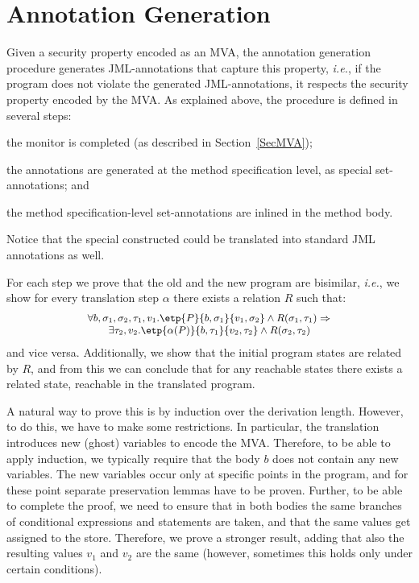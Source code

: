 \section{Annotation Generation}\label{SecAnnotGen}

Given a security property encoded as an MVA, the annotation generation
procedure generates JML-annotations that capture this property,
\emph{i.e.}, if the program does not violate the generated %
JML-annotations, it respects the security property encoded by the
MVA. As explained above, the procedure is defined in several steps:
\begin{inparaenum}
\item the monitor is completed (as described in Section~\ref{SecMVA});
\item the annotations are generated at the method specification level,
as special set-annotations; and
\item the method specification-level set-annotations are inlined in
the method body.
\end{inparaenum}
Notice that the special \CaseJML constructed could be translated into
standard JML annotations as well.

For each step we prove that the old and the new program are bisimilar,
\emph{i.e.}, we show for every translation step
\(\alpha\) there exists a relation \(R\) such that:
\[{\small
\begin{array}{l}
\forall b, \sigma_1, \sigma_2, \tau_1, v_1.
\etp{P}{b,\sigma_1}{v_1, \sigma_2} \wedge
R(\sigma_1, \tau_1) \Rightarrow \\
\qquad
\exists \tau_2, v_2.
\etp{\alpha(P)}{b, \tau_1}{v_2, \tau_2} \wedge
R(\sigma_2, \tau_2)
\end{array}}
\]
and vice versa. Additionally, we show that the initial program states
are related by \(R\), and from this we can conclude that for any
reachable states there exists a related state, reachable in the
translated program.

A natural way to prove this is by induction over the derivation
length. However, to do this, we have to make some restrictions. In
particular, the translation introduces new (ghost) variables to encode
the MVA. Therefore, to be able to apply induction, we typically
require that the body \(b\) does not contain any new variables. The
new variables occur only at specific points in the program, and for
these point separate preservation lemmas have to be proven. Further,
to be able to complete the proof, we need to ensure that in both
bodies the same branches of conditional expressions and statements are
taken, and that the same values get assigned to the store. Therefore,
we prove a stronger result, adding that also the resulting values
\(v_1\) and \(v_2\) are the same (however, sometimes this holds only
under certain conditions).



